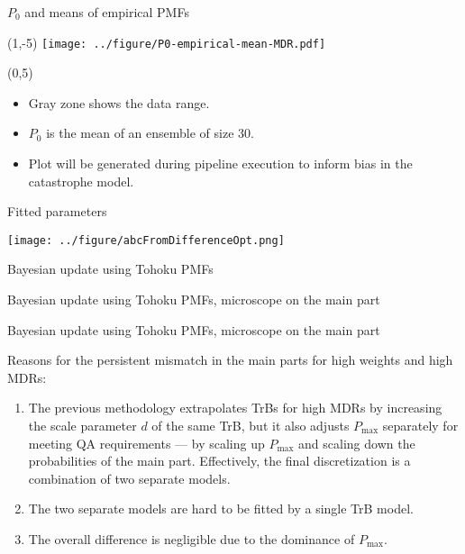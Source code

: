 \documentclass[aspectratio=169]{beamer}
\begin{document}
\begin{frame}{$P_0$ and means of empirical PMFs}
\begin{textblock}{1}(1,-5)
\texttt{[image: ../figure/P0-empirical-mean-MDR.pdf]}
\end{textblock}
\begin{textblock}{12}(0,5)
\begin{itemize}
\scriptsize\item Gray zone shows the data range.
\scriptsize\item $P_0$ is the mean of an ensemble of size 30.  
\scriptsize\item Plot will be generated during pipeline execution to inform bias in the catastrophe model.
\end{itemize}
\end{textblock}

\end{frame}


\begin{frame}{Fitted parameters}

\texttt{[image: ../figure/abcFromDifferenceOpt.png]}

\end{frame}

\begin{frame}{Bayesian update using Tohoku PMFs}
\end{frame}

\begin{frame}{Bayesian update using Tohoku PMFs, microscope on the main part}
\end{frame}

\begin{frame}{Bayesian update using Tohoku PMFs, microscope on the main part}

Reasons for the persistent mismatch in the main parts for high weights and high MDRs:\medskip

\begin{enumerate}
\item The previous methodology extrapolates TrBs for high MDRs by increasing the scale parameter $d$ of the same TrB, but it also adjusts $P_{\max}$ separately for meeting QA requirements --- by scaling up $P_{\max}$ and scaling down the probabilities of the main part. Effectively, the final discretization is a combination of two separate models.\medskip

\item The two separate models are hard to be fitted by a single TrB model. \medskip

\item The overall difference is negligible due to the dominance of $P_{\max}$.

\end{enumerate} 
\end{frame}
\end{document}
